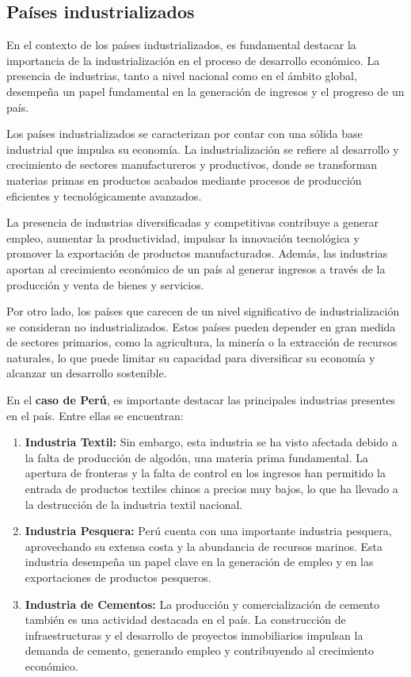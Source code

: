 \documentclass[
  a4paper,
]{article}
\begin{document}
\subsection{Países industrializados}\label{pauxedses-industrializados}

En el contexto de los países industrializados, es fundamental destacar
la importancia de la industrialización en el proceso de desarrollo
económico. La presencia de industrias, tanto a nivel nacional como en el
ámbito global, desempeña un papel fundamental en la generación de
ingresos y el progreso de un país.

Los países industrializados se caracterizan por contar con una sólida
base industrial que impulsa su economía. La industrialización se refiere
al desarrollo y crecimiento de sectores manufactureros y productivos,
donde se transforman materias primas en productos acabados mediante
procesos de producción eficientes y tecnológicamente avanzados.

La presencia de industrias diversificadas y competitivas contribuye a
generar empleo, aumentar la productividad, impulsar la innovación
tecnológica y promover la exportación de productos manufacturados.
Además, las industrias aportan al crecimiento económico de un país al
generar ingresos a través de la producción y venta de bienes y
servicios.

Por otro lado, los países que carecen de un nivel significativo de
industrialización se consideran no industrializados. Estos países pueden
depender en gran medida de sectores primarios, como la agricultura, la
minería o la extracción de recursos naturales, lo que puede limitar su
capacidad para diversificar su economía y alcanzar un desarrollo
sostenible.

En el \textbf{caso de Perú}, es importante destacar las principales
industrias presentes en el país. Entre ellas se encuentran:

\begin{enumerate}
\def\labelenumi{\arabic{enumi}.}
\item
  \textbf{Industria Textil:} Sin embargo, esta industria se ha visto
  afectada debido a la falta de producción de algodón, una materia prima
  fundamental. La apertura de fronteras y la falta de control en los
  ingresos han permitido la entrada de productos textiles chinos a
  precios muy bajos, lo que ha llevado a la destrucción de la industria
  textil nacional.
\item
  \textbf{Industria Pesquera:} Perú cuenta con una importante industria
  pesquera, aprovechando su extensa costa y la abundancia de recursos
  marinos. Esta industria desempeña un papel clave en la generación de
  empleo y en las exportaciones de productos pesqueros.
\item
  \textbf{Industria de Cementos:} La producción y comercialización de
  cemento también es una actividad destacada en el país. La construcción
  de infraestructuras y el desarrollo de proyectos inmobiliarios
  impulsan la demanda de cemento, generando empleo y contribuyendo al
  crecimiento económico.
\end{enumerate}
\end{document}
